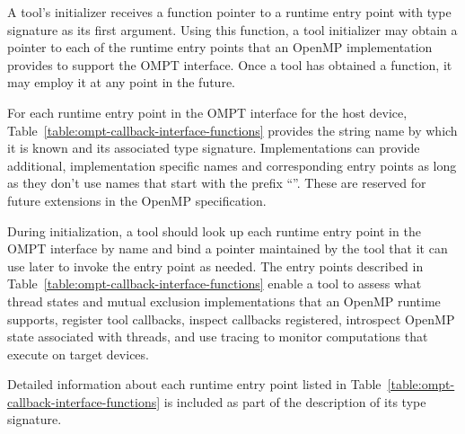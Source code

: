 A tool's initializer receives a function pointer to a 
runtime entry point with type signature
 as its first argument. Using this
function, a tool initializer may obtain a pointer to each of the
runtime entry points that an OpenMP implementation provides to support
the OMPT interface. Once a tool has obtained a 
 function, it may employ it at any point in the future.

For each runtime entry point in the OMPT interface for the host device, 
Table~\ref{table:ompt-callback-interface-functions} provides the string
name by which it is known and its associated type signature. Implementations
can provide additional, implementation specific names and corresponding
entry points as long as they don't use names that start with the prefix
``''. These are reserved for future extensions in the 
OpenMP specification.

During initialization, a tool should look up each runtime entry point in the
OMPT interface by name and bind a pointer maintained by the tool
that it can use later to invoke the entry point as needed. The entry points
described in Table~\ref{table:ompt-callback-interface-functions}
enable a tool to assess 
what thread states and mutual exclusion implementations that an OpenMP runtime supports,
register tool callbacks, inspect callbacks registered,
introspect OpenMP state associated with threads, and use tracing to monitor
computations that execute on target devices.

Detailed information about each runtime entry point listed in 
Table~\ref{table:ompt-callback-interface-functions} is included as
part of the description of its type signature.


